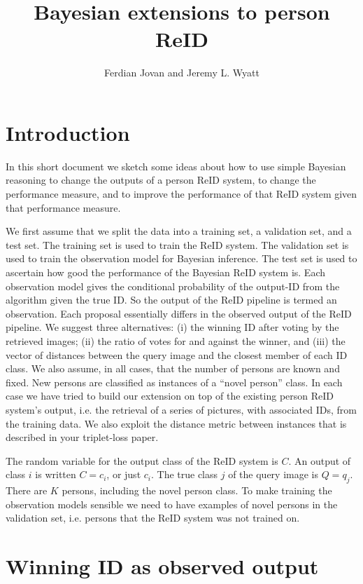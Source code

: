 \documentclass[10pt,a4paper,final]{article}
\title{Bayesian extensions to person ReID}
\author{Ferdian Jovan and Jeremy L. Wyatt}
\begin{document}
\maketitle

\section{Introduction}
In this short document we sketch some ideas about how to use simple Bayesian reasoning to change the outputs of a person ReID system, to change the performance measure, and to improve the performance of that ReID system given that performance measure.

We first assume that we split the data into a training set, a validation set, and a test set. The training set is used to train the ReID system. The validation set is used to train the observation model for Bayesian inference. The test set is used to ascertain how good the performance of the Bayesian ReID system is. Each observation model gives the conditional probability of the output-ID from the algorithm given the true ID. So the output of the ReID pipeline is termed an observation. Each proposal essentially differs in  the observed output of the ReID pipeline. We suggest three alternatives: (i) the winning ID after voting by the retrieved images; (ii) the ratio of votes for and against the winner, and (iii) the vector of distances between the query image and the closest member of each ID class. %
We also assume, in all cases, that the number of persons are known and fixed. New persons are classified as instances of a ``novel person'' class. In each case we have tried to build our extension on top of the existing person ReID system's output, i.e. the retrieval of a series of pictures, with associated IDs, from the training data. We also exploit the distance metric between instances that is described in your triplet-loss paper.

The random variable for the output class of the ReID system is $C$. An output of class $i$ is written $C=c_i$, or just $c_i$. The true class $j$ of the query image is $Q = q_j$. There are $K$ persons, including the novel person class. To make training the observation models sensible we need to have examples of novel persons in the validation set, i.e. persons that the ReID system was not trained on.

\section{Winning ID as observed output}
\end{document}
